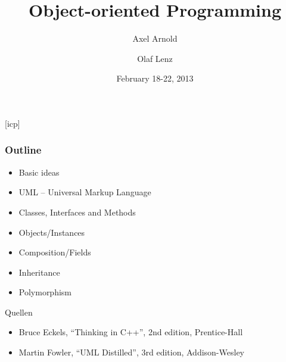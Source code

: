 \documentclass{slides}
\begin{document}
\graphicspath{{figures/}}

\title[Object-oriented Programming]{\Large Object-oriented Programming}

\author[A. Arnold and O. Lenz]{Axel Arnold \and Olaf Lenz} 
\date{February 18-22, 2013}

\begin{frame}
  \titlepage
\end {frame}
[icp]

\begin{frame}
  \frametitle{Outline}

  \begin{itemize}
  \item Basic ideas
  \item UML -- Universal Markup Language
  \item Classes, Interfaces and Methods
  \item Objects/Instances
  \item Composition/Fields
  \item Inheritance
  \item Polymorphism
  \end{itemize}

  \begin{block}{Quellen}
    \begin{itemize}
    \item Bruce Eckels, ``Thinking in C++'', 2nd edition, Prentice-Hall
    \item Martin Fowler, ``UML Distilled'', 3rd edition, Addison-Wesley
    \end{itemize}
  \end{block}
  
\end{frame}
\end{document}
